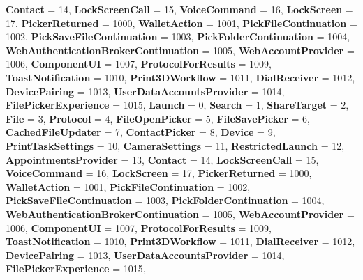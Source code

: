 \begin{DoxyCompactItemize}
{\bfseries Contact} = 14, 
{\bfseries Lock\+Screen\+Call} = 15, 
{\bfseries Voice\+Command} = 16, 
{\bfseries Lock\+Screen} = 17, 
\newline
{\bfseries Picker\+Returned} = 1000, 
{\bfseries Wallet\+Action} = 1001, 
{\bfseries Pick\+File\+Continuation} = 1002, 
{\bfseries Pick\+Save\+File\+Continuation} = 1003, 
\newline
{\bfseries Pick\+Folder\+Continuation} = 1004, 
{\bfseries Web\+Authentication\+Broker\+Continuation} = 1005, 
{\bfseries Web\+Account\+Provider} = 1006, 
{\bfseries Component\+UI} = 1007, 
\newline
{\bfseries Protocol\+For\+Results} = 1009, 
{\bfseries Toast\+Notification} = 1010, 
{\bfseries Print3\+D\+Workflow} = 1011, 
{\bfseries Dial\+Receiver} = 1012, 
\newline
{\bfseries Device\+Pairing} = 1013, 
{\bfseries User\+Data\+Accounts\+Provider} = 1014, 
{\bfseries File\+Picker\+Experience} = 1015, 
{\bfseries Launch} = 0, 
\newline
{\bfseries Search} = 1, 
{\bfseries Share\+Target} = 2, 
{\bfseries File} = 3, 
{\bfseries Protocol} = 4, 
\newline
{\bfseries File\+Open\+Picker} = 5, 
{\bfseries File\+Save\+Picker} = 6, 
{\bfseries Cached\+File\+Updater} = 7, 
{\bfseries Contact\+Picker} = 8, 
\newline
{\bfseries Device} = 9, 
{\bfseries Print\+Task\+Settings} = 10, 
{\bfseries Camera\+Settings} = 11, 
{\bfseries Restricted\+Launch} = 12, 
\newline
{\bfseries Appointments\+Provider} = 13, 
{\bfseries Contact} = 14, 
{\bfseries Lock\+Screen\+Call} = 15, 
{\bfseries Voice\+Command} = 16, 
\newline
{\bfseries Lock\+Screen} = 17, 
{\bfseries Picker\+Returned} = 1000, 
{\bfseries Wallet\+Action} = 1001, 
{\bfseries Pick\+File\+Continuation} = 1002, 
\newline
{\bfseries Pick\+Save\+File\+Continuation} = 1003, 
{\bfseries Pick\+Folder\+Continuation} = 1004, 
{\bfseries Web\+Authentication\+Broker\+Continuation} = 1005, 
{\bfseries Web\+Account\+Provider} = 1006, 
\newline
{\bfseries Component\+UI} = 1007, 
{\bfseries Protocol\+For\+Results} = 1009, 
{\bfseries Toast\+Notification} = 1010, 
{\bfseries Print3\+D\+Workflow} = 1011, 
\newline
{\bfseries Dial\+Receiver} = 1012, 
{\bfseries Device\+Pairing} = 1013, 
{\bfseries User\+Data\+Accounts\+Provider} = 1014, 
{\bfseries File\+Picker\+Experience} = 1015, 

\end{DoxyCompactItemize}
